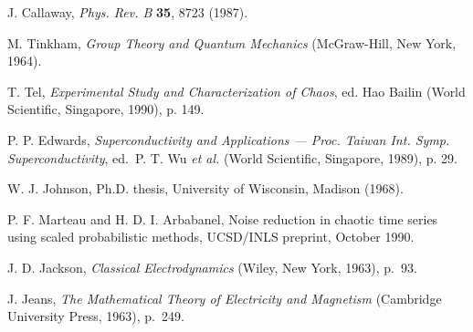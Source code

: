 \documentclass{ws-ijmpc}
\begin{document}

\begin{thebibliography}{0}
 J. Callaway, {\it Phys. Rev. B} {\bf 35}, 8723 (1987).

 M. Tinkham, {\it Group Theory and Quantum Mechanics}
(McGraw-Hill, New York, 1964).

 T. Tel, {\it Experimental Study and Characterization
of Chaos}, ed. Hao Bailin (World Scientific, Singapore, 1990), p. 149.

 P. P. Edwards, {\it Superconductivity and
Applications --- Proc. Taiwan Int. Symp. Superconductivity},
ed.~P. T. Wu {\it et al.} (World Scientific, Singapore, 1989), p. 29.

 W. J. Johnson, Ph.D. thesis, University of Wisconsin,
Madison (1968).

 P. F. Marteau and H. D. I. Arbabanel, Noise reduction in
chaotic time series using scaled probabilistic methods, UCSD/INLS
preprint, October 1990.

 J. D. Jackson, {\it Classical Electrodynamics} (Wiley,
New York, 1963), p.~93.

 J. Jeans, {\it The Mathematical Theory of Electricity
and Magnetism} (Cambridge University Press, 1963), p.~249.
\end{thebibliography}
\end{document}
